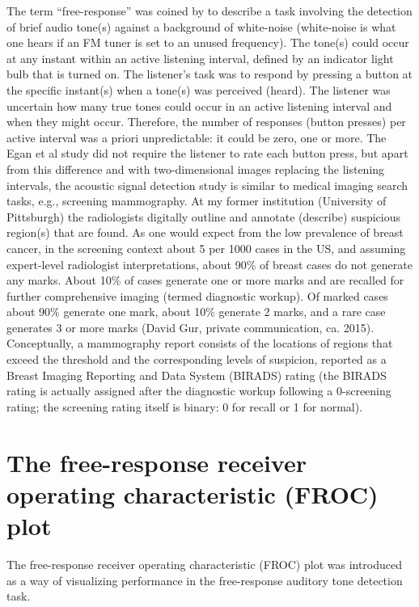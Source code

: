 \documentclass[
]{book}
\begin{document}
The term ``free-response'' was coined by \citep{RN897} to describe a task involving the detection of brief audio tone(s) against a background of white-noise (white-noise is what one hears if an FM tuner is set to an unused frequency). The tone(s) could occur at any instant within an active listening interval, defined by an indicator light bulb that is turned on. The listener's task was to respond by pressing a button at the specific instant(s) when a tone(s) was perceived (heard). The listener was uncertain how many true tones could occur in an active listening interval and when they might occur. Therefore, the number of responses (button presses) per active interval was a priori unpredictable: it could be zero, one or more. The Egan et al study did not require the listener to rate each button press, but apart from this difference and with two-dimensional images replacing the listening intervals, the acoustic signal detection study is similar to medical imaging search tasks, e.g., screening mammography. At my former institution (University of Pittsburgh) the radiologists digitally outline and annotate (describe) suspicious region(s) that are found. As one would expect from the low prevalence of breast cancer, in the screening context about 5 per 1000 cases in the US, and assuming expert-level radiologist interpretations, about 90\% of breast cases do not generate any marks. About 10\% of cases generate one or more marks and are recalled for further comprehensive imaging (termed diagnostic workup). Of marked cases about 90\% generate one mark, about 10\% generate 2 marks, and a rare case generates 3 or more marks (David Gur, private communication, ca. 2015). Conceptually, a mammography report consists of the locations of regions that exceed the threshold and the corresponding levels of suspicion, reported as a Breast Imaging Reporting and Data System (BIRADS) rating (the BIRADS rating is actually assigned after the diagnostic workup following a 0-screening rating; the screening rating itself is binary: 0 for recall or 1 for normal).

\hypertarget{froc-paradigm-froc-plot}{%
\section{The free-response receiver operating characteristic (FROC) plot}\label{froc-paradigm-froc-plot}}

The free-response receiver operating characteristic (FROC) plot was introduced \citep{RN2104} as a way of visualizing performance in the free-response auditory tone detection task.
\end{document}
